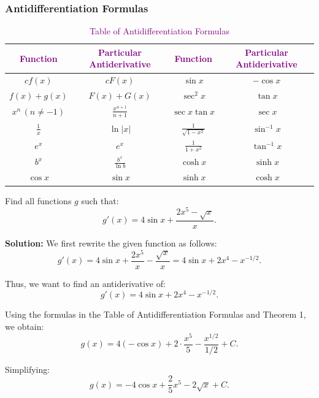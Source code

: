 \documentclass[12pt]{article}
\theoremstyle{beautifulthm}
\begin{document}
\newpage
\subsubsection{Antidifferentiation Formulas}

\begin{table}[h!]
\centering
\renewcommand{\arraystretch}{1.5}
\begin{tabular}{|c|c|c|c|}
\hline
\textbf{\textcolor{purple}{Function}} & \textbf{\textcolor{purple}{Particular Antiderivative}} & \textbf{\textcolor{purple}{Function}} & \textbf{\textcolor{purple}{Particular Antiderivative}} \\ \hline
$cf(x)$ & $cF(x)$ & $\sin x$ & $-\cos x$ \\ \hline
$f(x) + g(x)$ & $F(x) + G(x)$ & $\sec^2 x$ & $\tan x$ \\ \hline
$x^n \, (n \neq -1)$ & $\frac{x^{n+1}}{n+1}$ & $\sec x \tan x$ & $\sec x$ \\ \hline
$\frac{1}{x}$ & $\ln |x|$ & $\frac{1}{\sqrt{1 - x^2}}$ & $\sin^{-1} x$ \\ \hline
$e^x$ & $e^x$ & $\frac{1}{1 + x^2}$ & $\tan^{-1} x$ \\ \hline
$b^x$ & $\frac{b^x}{\ln b}$ & $\cosh x$ & $\sinh x$ \\ \hline
$\cos x$ & $\sin x$ & $\sinh x$ & $\cosh x$ \\ \hline
\end{tabular}
\caption{\textcolor{purple}{Table of Antidifferentiation Formulas}}
\end{table}

\begin{tcolorbox}[colback=examplebg, colframe=red!75!black, title=\textbf{EXAMPLE 2: Find the Integral of the Function}, fonttitle=\bfseries, sharp corners]
Find all functions $g$ such that:
\[
g'(x) = 4 \sin x + \frac{2x^5 - \sqrt{x}}{x}.
\]


\tcblower
\textbf{Solution:} 
We first rewrite the given function as follows:
\[
g'(x) = 4 \sin x + \frac{2x^5}{x} - \frac{\sqrt{x}}{x} = 4 \sin x + 2x^4 - x^{-1/2}.
\]

Thus, we want to find an antiderivative of:
\[
g'(x) = 4 \sin x + 2x^4 - x^{-1/2}.
\]

Using the formulas in the Table of Antidifferentiation Formulas and Theorem 1, we obtain:
\[
g(x) = 4(-\cos x) + 2 \cdot \frac{x^5}{5} - \frac{x^{1/2}}{1/2} + C.
\]

Simplifying:
\[
g(x) = -4 \cos x + \frac{2}{5}x^5 - 2\sqrt{x} + C.
\]



\end{tcolorbox}
\end{document}
